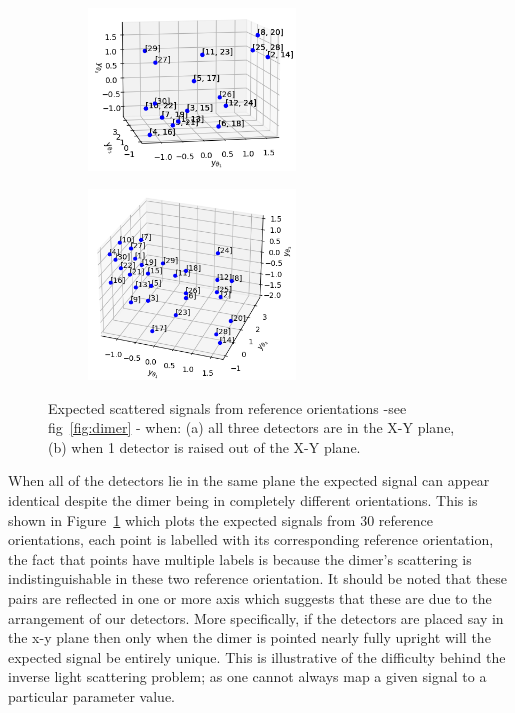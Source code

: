 \documentclass[12pt]{spieman}
\begin{document}
\begin{spacing}{1.5}
\begin{figure}[h]
	\centering
	\begin{subfigure}{0.49\textwidth}
		\subcaption{}
		\includegraphics[width=5.5cm]{./Images/fig4a.png}
	\end{subfigure}
	\begin{subfigure}{0.4\textwidth}
		\subcaption{}
		\includegraphics[width=5.5cm]{./Images/fig4b.png}
	\end{subfigure}
	\caption{Expected scattered signals from reference orientations -see fig~\ref{fig:dimer} - when: (a) all three detectors are in the X-Y plane, (b) when 1 detector is raised out of the X-Y plane.}
	\label{fig:detectors}
\end{figure}

 When all of the detectors lie in the same plane the expected signal can appear identical despite the dimer being in completely different orientations. This is shown in Figure~\ref{fig:detectors} which plots the expected signals from 30 reference orientations, each point is labelled with its corresponding reference orientation, the fact that points have multiple labels is because the dimer's scattering is indistinguishable in these two reference orientation. It should be noted that these pairs are reflected in one or more axis which suggests that these are due to the arrangement of our detectors. More specifically, if the detectors are placed say in the x-y plane then only when the dimer is pointed nearly fully upright will the expected signal be entirely unique. This is illustrative of the difficulty behind the inverse light scattering problem; as one cannot always map a given signal to a particular parameter value.


\end{spacing}
\end{document}
